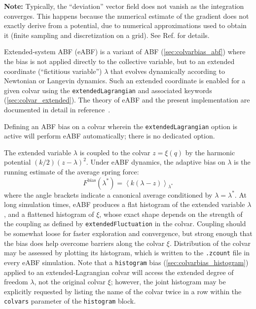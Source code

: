 \textbf{Note:} Typically, the ``deviation'' vector field does not
vanish as the integration converges. This happens because the
numerical estimate of the gradient does not exactly derive from a
potential, due to numerical approximations used to obtain it (finite
sampling and discretization on a grid). See Ref.\cite{Henin2021} for details.



\label{sec:eABF}

Extended-system ABF (eABF) is a variant of ABF (\ref{sec:colvarbias_abf})
where the bias is not applied
directly to the collective variable, but to an extended coordinate  (``fictitious variable'')
$\lambda$ that evolves dynamically according to Newtonian or Langevin dynamics.
Such an extended coordinate is enabled for a given colvar using the
\texttt{extendedLagrangian} and associated keywords (\ref{sec:colvar_extended}).
The theory of eABF and the present implementation are documented in detail
in reference~\cite{Lesage2017}.

Defining an ABF bias on a colvar wherein the \texttt{extendedLagrangian} option
is active will perform eABF automatically; there is no dedicated option.

The extended variable $\lambda$ is coupled to the colvar $z=\xi(q)$ by the harmonic potential
$(k/2) (z - \lambda)^2$.
Under eABF dynamics, the adaptive bias on $\lambda$ is
the running estimate of the average spring force:
\begin{equation}
F^{\mathrm{bias}}(\lambda^{*}) = \left\langle k(\lambda{} - z) \right\rangle_{\lambda^{*}}
\end{equation}
where the angle brackets indicate a canonical average conditioned by $\lambda=\lambda^*$.
At long simulation times, eABF produces a flat histogram of the extended variable $\lambda$,
and a flattened histogram of $\xi$, whose exact shape depends on the strength of the coupling
as defined by \texttt{extendedFluctuation} in the colvar.
Coupling should be somewhat loose for faster exploration and convergence, but strong
enough that the bias does help overcome barriers along the colvar $\xi$.\cite{Lesage2017}
Distribution of the colvar may be assessed by plotting its histogram, which
is written to the \outputName\texttt{.zcount} file in every eABF simulation.
Note that a \texttt{histogram} bias (\ref{sec:colvarbias_histogram})
applied to an extended-Lagrangian colvar
will access the extended degree of freedom $\lambda$, not the original colvar $\xi$;
however, the joint histogram may be explicitly requested by listing the name of the
colvar twice in a row within the \texttt{colvars} parameter of the \texttt{histogram} block.

